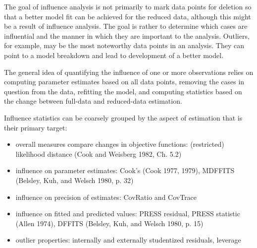 \documentclass[12pt, a4paper]{report}
\theoremstyle{plain}
\theoremstyle{definition}
\theoremstyle{remark}
\begin{document}
The goal of influence analysis is not primarily to mark data
points for deletion so that a better model fit can be achieved for the reduced data, although this might be a
result of influence analysis. The goal is rather to determine which cases are influential and the manner in
which they are important to the analysis. Outliers, for example, may be the most noteworthy data points in
an analysis. They can point to a model breakdown and lead to development of a better model.



The general idea of quantifying the influence of one or more observations relies on computing parameter estimates based on all data points, removing the cases in question from the data, refitting the model, and computing statistics based on the change between full-data and reduced-data estimation. 


Influence statistics can be coarsely grouped by the aspect of estimation that is their primary target:
\begin{itemize}
	\item overall measures compare changes in objective functions: (restricted) likelihood distance (Cook and Weisberg 1982, Ch. 5.2)
	\item influence on parameter estimates: Cook’s  (Cook 1977, 1979), MDFFITS (Belsley, Kuh, and Welsch 1980, p. 32)
	\item influence on precision of estimates: CovRatio and CovTrace
	\item influence on fitted and predicted values: PRESS residual, PRESS statistic (Allen 1974), DFFITS (Belsley, Kuh, and Welsch 1980, p. 15)
	\item outlier properties: internally and externally studentized residuals, leverage
\end{itemize}
\end{document}
